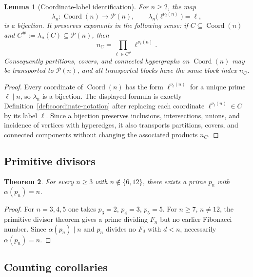 \documentclass[11pt,letterpaper]{article}
\numberwithin{equation}{section}
\theoremstyle{plain}
\newtheorem{theorem}{Theorem}[section]
\newtheorem{lemma}[theorem]{Lemma}
\theoremstyle{definition}
\theoremstyle{remark}
\DeclareMathOperator{\Coord}{Coord}
\begin{document}
\begin{lemma}[Coordinate-label identification]\label{lem:coordinate-label-bridge}
For \(n\ge2\), the map
\[
\lambda_n:\Coord(n)\longrightarrow\mathcal P(n),
\qquad \lambda_n\bigl(\ell^{\nu_\ell(n)}\bigr)=\ell,
\]
is a bijection. It preserves exponents in the following sense: if
\(C\subseteq\Coord(n)\) and \(C^\#:=\lambda_n(C)\subseteq\mathcal P(n)\), then
\[
n_C=\prod_{\ell\in C^\#}\ell^{\nu_\ell(n)}.
\]
Consequently partitions, covers, and connected hypergraphs on \(\Coord(n)\) may
be transported to \(\mathcal P(n)\), and all transported blocks have the same
block index \(n_C\).
\end{lemma}

\begin{proof}
Every coordinate of \(\Coord(n)\) has the form
\(\ell^{\nu_\ell(n)}\) for a unique prime \(\ell\mid n\), so \(\lambda_n\) is a
bijection. The displayed formula is exactly Definition~\ref{def:coordinate-notation}
after replacing each coordinate \(\ell^{\nu_\ell(n)}\in C\) by its label
\(\ell\). Since a bijection preserves inclusions, intersections, unions, and
incidence of vertices with hyperedges, it also transports partitions, covers,
and connected components without changing the associated products \(n_C\).
\end{proof}

\subsection{Primitive divisors}\label{subsec:primitive}

\begin{theorem}\label{thm:primitive-divisors}
For every $n\ge 3$ with $n\notin\{6,12\}$, there exists a prime $p_n$ with
$\alpha(p_n)=n$.
\end{theorem}

\begin{proof}
For $n=3,4,5$ one takes $p_3=2$, $p_4=3$, $p_5=5$. For $n\ge 7$, $n\neq 12$,
the primitive divisor theorem
\cite{Carmichael1913PrimitiveDivisors,Yabuta2001PrimitiveDivisorFibonacci,%
BiluHanrotVoutier2001PrimitiveDivisorsLucas}
gives a prime dividing $F_n$ but no earlier Fibonacci number. Since
$\alpha(p_n)\mid n$ and $p_n$ divides no $F_d$ with $d<n$, necessarily
$\alpha(p_n)=n$.
\end{proof}

\subsection{Counting corollaries}\label{subsec:counting}
\end{document}
